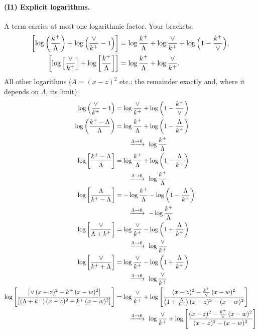 \documentclass[10pt]{article}
\numberwithin{equation}{section}
\begin{document}
\paragraph{(I1) Explicit logarithms.} A term carries at most one logarithmic factor. Your brackets:
\begin{align}
\left[\log{\left(\frac{k^{+}}{\Lambda}\right)}+\log{\left(\frac{\vee}{k^{+}}-1\right)}\right]&=\log\frac{k^+}{\Lambda}+\log\frac{\vee}{k^+}+\log\Big(1-\frac{k^+}{\vee}\Big),\notag\\
\left[\log{\left[\frac{\vee}{k^{+}}\right]}+\log{\left[\frac{k^{+}}{\Lambda}\right]}\right]&=\log\frac{k^+}{\Lambda}+\log\frac{\vee}{k^+}.\notag
\end{align}
All other logarithms ($A=(x-z)^2$ etc.; the remainder exactly and, where it depends on $\Lambda$, its limit):
\begin{align}
\log{\left(\frac{\vee}{k^{+}}-1\right)} &= \log\frac{\vee}{k^+} + \log{\left(1-\frac{k^{+}}{\vee}\right)} \notag\\
\log{\left(\frac{k^{+}-\Lambda}{\Lambda}\right)} &= \log\frac{k^+}{\Lambda} + \log{\left(1-\frac{\Lambda}{k^{+}}\right)}\notag\\&\qquad\xrightarrow{\Lambda\to0}\ \log\frac{k^+}{\Lambda} \notag\\
\log{\left[\frac{k^{+}-\Lambda}{\Lambda}\right]} &= \log\frac{k^+}{\Lambda} + \log{\left(1-\frac{\Lambda}{k^{+}}\right)}\notag\\&\qquad\xrightarrow{\Lambda\to0}\ \log\frac{k^+}{\Lambda} \notag\\
\log{\left[\frac{\Lambda}{k^{+}-\Lambda}\right]} &= -\log\frac{k^+}{\Lambda} - \log{\left(1-\frac{\Lambda}{k^{+}}\right)}\notag\\&\qquad\xrightarrow{\Lambda\to0}\ -\log\frac{k^+}{\Lambda} \notag\\
\log{\left[\frac{\vee}{\Lambda+k^{+}}\right]} &= \log\frac{\vee}{k^+} - \log{\left(1+\frac{\Lambda}{k^{+}}\right)}\notag\\&\qquad\xrightarrow{\Lambda\to0}\ \log\frac{\vee}{k^+} \notag\\
\log{\left[\frac{\vee}{k^{+}+\Lambda}\right]} &= \log\frac{\vee}{k^+} - \log{\left(1+\frac{\Lambda}{k^{+}}\right)}\notag\\&\qquad\xrightarrow{\Lambda\to0}\ \log\frac{\vee}{k^+} \notag\\
\log{\left[\frac{\left[\vee\, (x-z)^{2} - k^{+}\, (x-w)^{2}\right]}{\left[(\Lambda + k^{+})\, (x-z)^{2} - k^{+}\, (x-w)^{2}\right]}\right]} &= \log\frac{\vee}{k^+} + \log{\left[\frac{(x-z)^{2}-\frac{k^{+}}{\vee}\,(x-w)^{2}}{\left(1+\frac{\Lambda}{k^{+}}\right)(x-z)^{2}-(x-w)^{2}}\right]}\notag\\&\qquad\xrightarrow{\Lambda\to0}\ \log\frac{\vee}{k^+} + \log{\left[\frac{(x-z)^{2}-\frac{k^{+}}{\vee}\,(x-w)^{2}}{(x-z)^{2}-(x-w)^{2}}\right]} \notag\\

\end{align}
\end{document}
